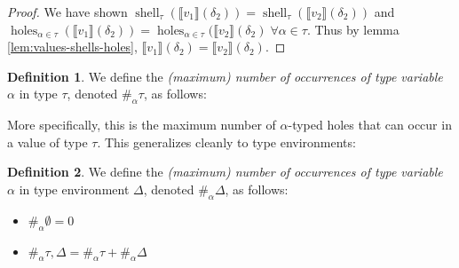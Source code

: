\documentclass{report}
\theoremstyle{definition}
\newtheorem{definition}{Definition}
\newcommand{\den}[1]{\llbracket #1 \rrbracket}
\DeclareMathOperator{\shell}{shell}
\DeclareMathOperator{\holes}{holes}
\begin{document}
\begin{proof}
	We have shown \(\shell_\tau(\den{v_1}(\delta_2)) = \shell_{\tau}(\den{v_2}(\delta_2))\) and
	\(\holes_{\alpha \in \tau}(\den{v_1}(\delta_2)) = \holes_{\alpha \in \tau}(\den{v_2}(\delta_2) \; \forall \alpha \in \tau\).
	Thus by lemma \ref{lem:values-shells-holes}, \(\den{v_1}(\delta_2) = \den{v_2}(\delta_2)\).
\end{proof}

\begin{definition}
	We define the \emph{(maximum) number of occurrences of type variable \(\alpha\)} in type \(\tau\), denoted \(\#_\alpha \tau\), as follows:
\end{definition}

More specifically, this is the maximum number of \(\alpha\)-typed holes that can occur in a value of type \(\tau\).
This generalizes cleanly to type environments:

\begin{definition}
	We define the \emph{(maximum) number of occurrences of type variable \(\alpha\)} in type environment \(\Delta\), denoted \(\#_\alpha \Delta\), as follows:
	\begin{itemize}
		\item \(\#_\alpha \emptyset = 0\)
		\item \(\#_\alpha \tau, \Delta = \#_\alpha \tau + \#_\alpha \Delta\)
	\end{itemize}
\end{definition}
\end{document}
